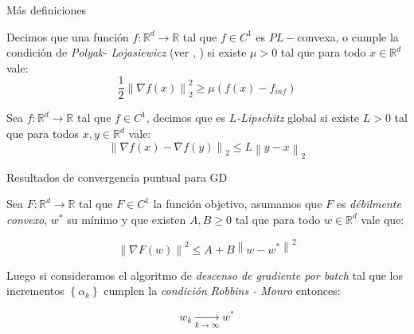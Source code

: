 \documentclass{beamer}
\newcommand{\R}{{\mathbb{R}}}
\newcommand{\norm}[1]{\left\lVert#1\right\rVert}
\newcommand{\sett}[1]{\left\lbrace#1\right\rbrace}
\newcommand{\underlimitinf}[1]{\xrightarrow[#1 \rightarrow \infty]{}}
\begin{document}
\begin{frame}{M\'as definiciones}

\begin{definition}
	\label{def: Condicion PL}
	Decimos que una funci\'on $f:\R^d \rightarrow \R$ tal que $f \in C^1$ es $PL-$convexa, o cumple la condici\'on de \textit{Polyak- Lojasiewicz} (ver \cite{polyak:1963}, \cite{lojasiewicz:1963}) si existe $\mu >0$ tal que para todo $x \in \R^d$ vale:
	\begin{equation*}
	\frac{1}{2} \norm{\nabla f(x)}^2_2 \geq \mu \left(f(x) - f_{inf}\right)
	\end{equation*}
\end{definition}

\begin{definition}
	\label{def: L Lipschitz}
	Sea $f:\R^d \rightarrow \R$ tal que $f \in C^1$, decimos que es $L$\textit{-Lipschitz} global si existe $L > 0$ tal que para todos $x,y \in \R^d$ vale:
	\begin{equation*}
	\norm{\nabla f(x) - \nabla f (y)}_2 \leq  L\norm{y-x}_2
	\end{equation*}
\end{definition}

\end{frame}

\begin{frame}{Resultados de convergencia puntual para GD}

\begin{theorem}
	Sea $F: \R^d \rightarrow \R$ tal que $F \in C^1$ la funci\'on objetivo, asumamos que $F$ es \textit{d\'ebilmente convexo}, $w^*$ su m\'inimo y que existen $A,B \geq 0$ tal que para todo $w \in \R^d$ vale que:
	
	\begin{equation*}
	\norm{\nabla F(w)}^2 \leq A + B \norm{w - w^*}^2
	\end{equation*}
	
	Luego si consideramos el algoritmo de \textit{descenso de gradiente por batch} tal que los incrementos $\sett{\alpha_k}$  cumplen la \textit{condici\'on Robbins - Monro} entonces:
	
	\begin{equation*}
	w_k \underlimitinf{k} w^*
	\end{equation*}
	
\end{theorem}

\end{frame}
\end{document}

